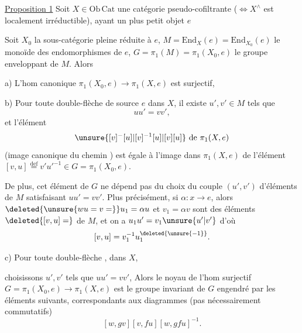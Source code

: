 
\uline{Proposition 1} Soit $X\in\mathrm{Ob}\,\mathrm{Cat}$  une catégorie pseudo-cofiltrante ($\Longleftrightarrow X^\wedge$ est localement irréductible), ayant un plus petit objet $e$

Soit $X_0$ la sous-catégorie pleine réduite à $e$, $M=\mathrm{End}_X(e)=\mathrm{End}_{X_0}(e)$ le monoïde des endomorphismes de $e$, $G=\pi_1(M)=\pi_1(X_0,e)$ le groupe enveloppant de $M$. Alors

a) L'hom canonique $\pi_1(X_0,e)\longrightarrow\pi_1(X,e)$ est surjectif, 

b) Pour toute double-flèche de source $e$
dans $X$, il existe $u',v'\in M$ tels que
\[
uu'=vv',
\]
et l'élément
\[
\unsure{[v]^{-}[u]|[v]^{-1}[u]|[v][u]}\ \text{de}\ \pi_1(X,e)
\]
(image canonique du chemin )
est égale à l'image dans $\pi_1(X,e)$ de l'élément $[v,u]\overset{\mathrm{def}}{=}v'u'^{-1}\in G=\pi_1(X_0,e)$.

De plus,  cet élément \inserted{$[v,u]$} de $G$ ne dépend pas du choix du couple $(u',v')$ d'éléments de $M$ satisfaisant $uu'=vv'$. Plus précisément, si $\alpha:x\longrightarrow e$, alors $\deleted{\unsure{w u=v=}}u_1=\alpha u$ et $v_1=\alpha v$ sont des éléments $\deleted{[v,u]=}$ de $M$, et on a $u_1u'=v_1\unsure{u'|v'}$ d'où
\[
[v,u]=v_1^{-1}u_1^{\deleted{\unsure{-1}}}.
\]

c) Pour toute double-flèche , dans $X$,


choisissons $u',v'$  tels que $uu'=vv'$,  Alors le noyau de l'hom surjectif $G=\pi_1(X_0,e)\longrightarrow\pi_1(X,e)$ est le groupe invariant de $G$ engendré par les éléments suivants, correspondants aux diagrammes (pas nécessairement commutatifs)
\[
[w,gv][v,fu][w,gfu]^{-1}.
\]

